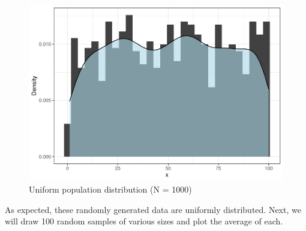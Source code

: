 \documentclass[
]{book}
\begin{document}
\begin{figure}

{\centering \includegraphics{The_Fundamentals_of_People_Analytics_files/figure-latex/unnamed-chunk-127-1} 

}

\caption{Uniform population distribution (N = 1000)}\label{fig:unnamed-chunk-127}
\end{figure}

As expected, these randomly generated data are uniformly distributed. Next, we will draw 100 random samples of various sizes and plot the average of each.
\end{document}
